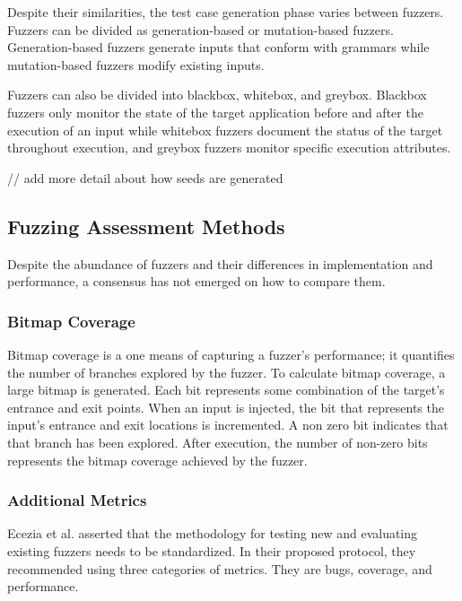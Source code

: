 Despite their similarities, the test case generation phase varies between fuzzers. Fuzzers can be 
divided as generation-based or mutation-based fuzzers. Generation-based fuzzers generate inputs that 
conform with grammars while mutation-based fuzzers modify existing inputs. 

Fuzzers can also be divided into blackbox, whitebox, and greybox. Blackbox fuzzers only monitor the 
state of the target application before and after the execution of an input while whitebox fuzzers 
document the status of the target throughout execution, and greybox fuzzers monitor specific 
execution attributes. \cite{Zhu}

// add more detail about how seeds are generated

\subsection{Fuzzing Assessment Methods}
Despite the abundance of fuzzers and their differences in implementation and performance, a consensus has not emerged on how to compare them.

\subsubsection{Bitmap Coverage}
Bitmap coverage is a one means of capturing a fuzzer's performance; it quantifies the number of branches explored by the fuzzer. To calculate bitmap coverage, a large bitmap is generated. Each bit represents some combination of the target's entrance and exit points. When an input is injected, the bit that represents the input's entrance and exit locations is incremented. A non zero bit indicates that that branch has been explored. After execution, the number of non-zero bits represents the bitmap coverage achieved by the fuzzer. \cite{AFLGitHub}

\subsubsection{Additional Metrics}
Ecezia et al. asserted that the methodology for testing new and evaluating 
existing fuzzers needs to be standardized. In their proposed protocol, 
they recommended using three categories of metrics. They are bugs, 
coverage, and performance. 

